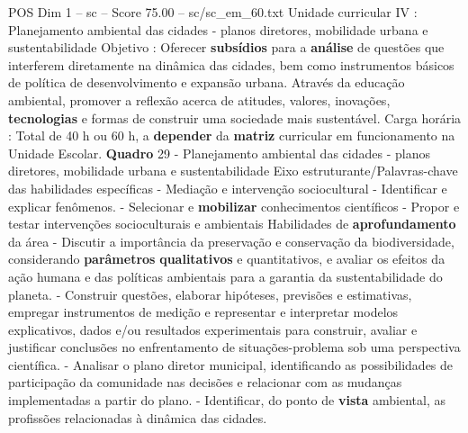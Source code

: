 \begin{textsample}{POS Dim 1 – sc – Score 75.00 – sc/sc\_em\_60.txt}
Unidade curricular IV : Planejamento ambiental das cidades - planos diretores, mobilidade urbana e sustentabilidade Objetivo : Oferecer \textbf{subsídios} para a \textbf{análise} de questões que interferem diretamente na dinâmica das cidades, bem como instrumentos básicos de política de desenvolvimento e expansão urbana.
Através da educação ambiental, promover a reflexão acerca de atitudes, valores, inovações, \textbf{tecnologias} e formas de construir uma sociedade mais sustentável.
Carga horária : Total de 40 h ou 60 h, a \textbf{depender} da \textbf{matriz} curricular em funcionamento na Unidade Escolar. \textbf{Quadro} 29 - Planejamento ambiental das cidades - planos diretores, mobilidade urbana e sustentabilidade Eixo estruturante/Palavras-chave das habilidades específicas - Mediação e intervenção sociocultural - Identificar e explicar fenômenos. - Selecionar e \textbf{mobilizar} conhecimentos científicos - Propor e testar intervenções socioculturais e ambientais Habilidades de \textbf{aprofundamento} da área - Discutir a importância da preservação e conservação da biodiversidade, considerando \textbf{parâmetros} \textbf{qualitativos} e quantitativos, e avaliar os efeitos da ação humana e das políticas ambientais para a garantia da sustentabilidade do planeta. - Construir questões, elaborar hipóteses, previsões e estimativas, empregar instrumentos de medição e representar e interpretar modelos explicativos, dados e/ou resultados experimentais para construir, avaliar e justificar conclusões no enfrentamento de situações-problema sob uma perspectiva científica. - Analisar o plano diretor municipal, identificando as possibilidades de participação da comunidade nas decisões e relacionar com as mudanças implementadas a partir do plano. - Identificar, do ponto de \textbf{vista} ambiental, as profissões relacionadas à dinâmica das cidades.

\end{textsample}
